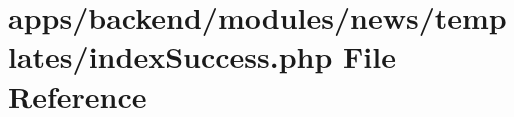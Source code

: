 \hypertarget{backend_2modules_2news_2templates_2index_success_8php}{\section{apps/backend/modules/news/templates/index\-Success.php File Reference}
\label{backend_2modules_2news_2templates_2index_success_8php}
}
